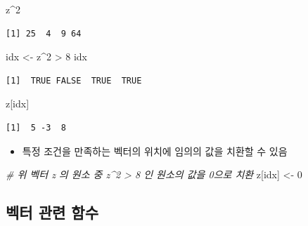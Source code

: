 \documentclass[
  11pt,
]{krantz}
\newenvironment{Shaded}{\begin{snugshade}}{\end{snugshade}}
\newcommand{\CommentTok}[1]{\textcolor[rgb]{0.37,0.37,0.37}{\textit{#1}}}
\newcommand{\DecValTok}[1]{\textcolor[rgb]{0.06,0.06,0.06}{#1}}
\newcommand{\NormalTok}[1]{#1}
\newcommand{\OtherTok}[1]{\textcolor[rgb]{0.37,0.37,0.37}{#1}}
\newcommand{\SpecialCharTok}[1]{\textcolor[rgb]{0,0,0}{#1}}
\providecommand{\tightlist}{%
  \setlength{\itemsep}{0pt}\setlength{\parskip}{0pt}}
\begin{document}
\footnotesize

\begin{Shaded}
\begin{Highlighting}[]
\NormalTok{z}\SpecialCharTok{\^{}}\DecValTok{2}
\end{Highlighting}
\end{Shaded}

\begin{verbatim}
[1] 25  4  9 64
\end{verbatim}

\begin{Shaded}
\begin{Highlighting}[]
\NormalTok{idx }\OtherTok{\textless{}{-}}\NormalTok{ z}\SpecialCharTok{\^{}}\DecValTok{2} \SpecialCharTok{\textgreater{}} \DecValTok{8}
\NormalTok{idx}
\end{Highlighting}
\end{Shaded}

\begin{verbatim}
[1]  TRUE FALSE  TRUE  TRUE
\end{verbatim}

\begin{Shaded}
\begin{Highlighting}[]
\NormalTok{z[idx]}
\end{Highlighting}
\end{Shaded}

\begin{verbatim}
[1]  5 -3  8
\end{verbatim}

\normalsize

\begin{itemize}
\tightlist
\item
  특정 조건을 만족하는 벡터의 위치에 임의의 값을 치환할 수 있음
\end{itemize}

\footnotesize

\begin{Shaded}
\begin{Highlighting}[]
\CommentTok{\# 위 벡터 z 의 원소 중 z\^{}2 \textgreater{} 8 인 원소의 값을 0으로 치환}
\NormalTok{z[idx] }\OtherTok{\textless{}{-}} \DecValTok{0}
\end{Highlighting}
\end{Shaded}

\normalsize

\hypertarget{vector-function}{%
\subsection{벡터 관련 함수}\label{vector-function}}
\end{document}
